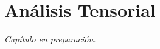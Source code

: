 \documentclass[../apunte_mecanica_clasica.tex]{subfiles}%
\begin{document}
\chapter{Análisis Tensorial}


\begin{center}
\vspace{1cm}
\textit{Capítulo en preparación.}
\end{center}
\end{document}
